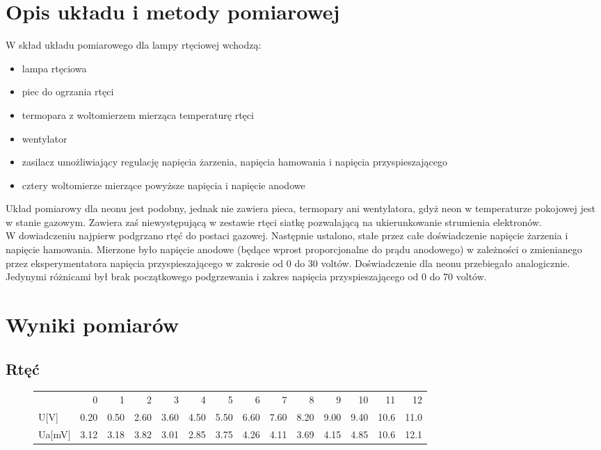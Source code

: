 \documentclass[a4paper,10pt]{article}
\begin{document}
\section{Opis układu i metody pomiarowej}
W skład układu pomiarowego dla lampy rtęciowej wchodzą:
\begin{itemize}
  \item lampa rtęciowa
  \item piec do ogrzania rtęci
  \item termopara z woltomierzem mierząca temperaturę rtęci
  \item wentylator
  \item zasilacz umożliwiający regulację napięcia żarzenia, napięcia hamowania i napięcia przyspieszającego
  \item cztery woltomierze mierzące powyższe napięcia i napięcie anodowe
\end{itemize}
Układ pomiarowy dla neonu jest podobny, jednak nie zawiera pieca, termopary ani wentylatora, gdyż neon w temperaturze pokojowej jest w stanie gazowym. Zawiera zaś niewystępującą w
zestawie rtęci siatkę pozwalającą na ukierunkowanie strumienia elektronów.\\
W dowiadczeniu najpierw podgrzano rtęć do postaci gazowej. Następnie ustalono, stałe przez całe doświadczenie napięcie żarzenia i napięcie hamowania. Mierzone było napięcie
anodowe (będące wprost proporcjonalne do prądu anodowego) w zależności o zmienianego przez eksperymentatora napięcia przyspieszającego w zakresie od 0 do 30 voltów. Doświadczenie
dla neonu przebiegało analogicznie. Jedynymi różnicami był brak początkowego podgrzewania i zakres napięcia przyspieszającego od 0 do 70 voltów.

\section{Wyniki pomiarów}
\subsection{Rtęć}
\begin{figure}[H]
\begin{tabular}{lrrrrrrrrrrrrr}
{} &    0  &    1  &    2  &    3  &    4  &    5  &    6  &    7  &    8  &    9  &    10 &    11 &    12 \\
U[V]  &  0.20 &  0.50 &  2.60 &  3.60 &  4.50 &  5.50 &  6.60 &  7.60 &  8.20 &  9.00 &  9.40 &  10.6 &  11.0 \\
Ua[mV] &  3.12 &  3.18 &  3.82 &  3.01 &  2.85 &  3.75 &  4.26 &  4.11 &  3.69 &  4.15 &  4.85 &  10.6 &  12.1 \\
\end{tabular}
\end{figure}
\end{document}
